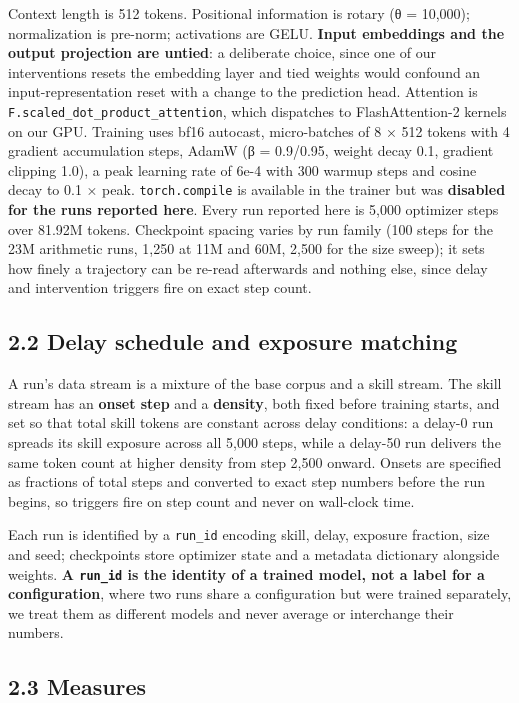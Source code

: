 \documentclass[11pt]{article}
\begin{document}
Context length is 512 tokens. Positional information is rotary (θ = 10,000); normalization is
pre-norm; activations are GELU. \textbf{Input embeddings and the output projection are untied}: a deliberate choice, since one of our interventions resets the embedding layer and tied
weights would confound an input-representation reset with a change to the prediction head.
Attention is \texttt{F.scaled\_dot\_product\_attention}, which dispatches to FlashAttention-2 kernels
on our GPU. Training uses bf16 autocast, micro-batches of 8 × 512 tokens with 4 gradient
accumulation steps, AdamW (β = 0.9/0.95, weight decay 0.1, gradient clipping 1.0), a peak
learning rate of 6e-4 with 300 warmup steps and cosine decay to 0.1 × peak. \texttt{torch.compile}
is available in the trainer but was \textbf{disabled for the runs reported here}. Every run
reported here is 5,000 optimizer steps over 81.92M tokens. Checkpoint spacing varies by run
family (100 steps for the 23M arithmetic runs, 1,250 at 11M and 60M, 2,500 for the size
sweep); it sets how finely a trajectory can be re-read afterwards and nothing else, since
delay and intervention triggers fire on exact step count.

\subsection{2.2 Delay schedule and exposure matching}\label{delay-schedule-and-exposure-matching}

A run's data stream is a mixture of the base corpus and a skill stream. The skill stream has
an \textbf{onset step} and a \textbf{density}, both fixed before training starts, and set so that total
skill tokens are constant across delay conditions: a delay-0 run spreads its skill exposure
across all 5,000 steps, while a delay-50 run delivers the same token count at higher density
from step 2,500 onward. Onsets are specified as fractions of total steps and converted to
exact step numbers before the run begins, so triggers fire on step count and never on
wall-clock time.

Each run is identified by a \texttt{run\_id} encoding skill, delay, exposure fraction, size and seed;
checkpoints store optimizer state and a metadata dictionary alongside weights. \textbf{A \texttt{run\_id}
is the identity of a trained model, not a label for a configuration}, where two runs share
a configuration but were trained separately, we treat them as different models and never
average or interchange their numbers.

\subsection{2.3 Measures}\label{measures}
\end{document}
